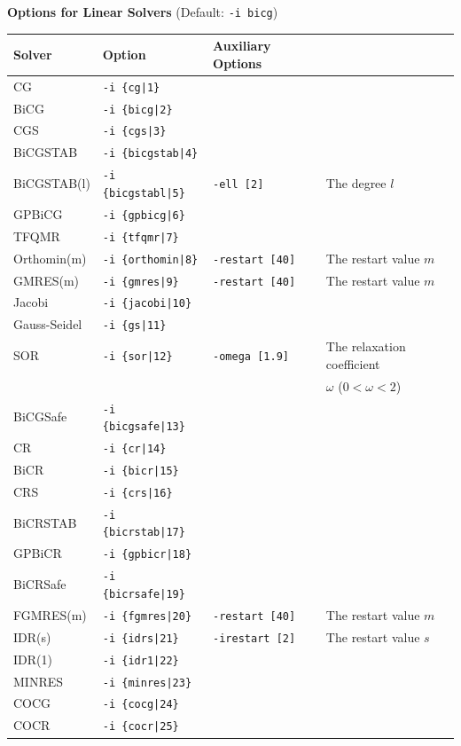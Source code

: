 \documentclass[a4paper]{article}
\begin{document}
\begin{minipage}[t]{\textwidth}
\begin{center}
{\bf Options for Linear Solvers} (Default: \verb=-i bicg=) \\
\begin{tabular}{l|lll}\hline\hline
 Solver      & Option              &  Auxiliary Options  & \\ \hline
 CG          & \verb=-i {cg|1}=         &    \\ 
 BiCG        & \verb=-i {bicg|2}=       &    \\
 CGS         & \verb=-i {cgs|3}=        &    \\
 BiCGSTAB    & \verb=-i {bicgstab|4}=   &    \\
 BiCGSTAB(l) & \verb=-i {bicgstabl|5}=  & \verb=-ell [2]=      & The degree $l$ \\
 GPBiCG      & \verb=-i {gpbicg|6}=     &    \\
 TFQMR       & \verb=-i {tfqmr|7}=      &    \\
 Orthomin(m) & \verb=-i {orthomin|8}=   & \verb=-restart [40]= & The restart
 value $m$  \\
 GMRES(m)    & \verb=-i {gmres|9}=      & \verb=-restart [40]= & The restart value $m$  \\ 
 Jacobi      & \verb=-i {jacobi|10}=    &    \\
 Gauss-Seidel& \verb=-i {gs|11}=        &    \\
 SOR         & \verb=-i {sor|12}=       & \verb=-omega [1.9]=  & The relaxation coefficient \\
             &                          &                      & $\omega$ ($0<\omega<2$) \\
 BiCGSafe    & \verb=-i {bicgsafe|13}=     &    \\
 CR          & \verb=-i {cr|14}=        &    \\ 
 BiCR        & \verb=-i {bicr|15}=      &    \\
 CRS         & \verb=-i {crs|16}=       &    \\
 BiCRSTAB    & \verb=-i {bicrstab|17}=  &    \\
 GPBiCR      & \verb=-i {gpbicr|18}=    &    \\
 BiCRSafe    & \verb=-i {bicrsafe|19}=  &    \\
 FGMRES(m)   & \verb=-i {fgmres|20}=    & \verb=-restart [40]= & The restart value $m$   \\ 
 IDR(s)      & \verb=-i {idrs|21}=      & \verb=-irestart [2]= & The restart
 value $s$  \\
 IDR(1)      & \verb=-i {idr1|22}=      &    \\ 
 MINRES      & \verb=-i {minres|23}=    &    \\
 COCG        & \verb=-i {cocg|24}=      &    \\
 COCR        & \verb=-i {cocr|25}=      &    \\   
\hline         
\end{tabular}
\end{center}
\end{minipage}
\end{document}

